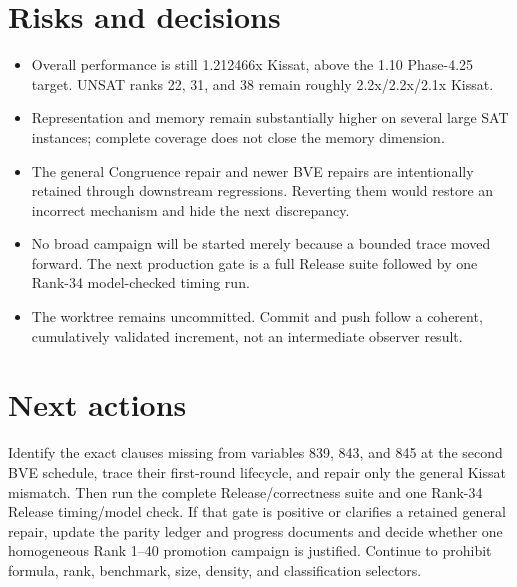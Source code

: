 \documentclass[11pt]{article}
\begin{document}
\section{Risks and decisions}

\begin{itemize}
\item Overall performance is still 1.212466x Kissat, above the 1.10 Phase-4.25
  target.  UNSAT ranks 22, 31, and 38 remain roughly 2.2x/2.2x/2.1x Kissat.
\item Representation and memory remain substantially higher on several large
  SAT instances; complete coverage does not close the memory dimension.
\item The general Congruence repair and newer BVE repairs are intentionally
  retained through downstream regressions.  Reverting them would restore an
  incorrect mechanism and hide the next discrepancy.
\item No broad campaign will be started merely because a bounded trace moved
  forward.  The next production gate is a full Release suite followed by one
  Rank-34 model-checked timing run.
\item The worktree remains uncommitted.  Commit and push follow a coherent,
  cumulatively validated increment, not an intermediate observer result.
\end{itemize}

\section{Next actions}

Identify the exact clauses missing from variables 839, 843, and 845 at the
second BVE schedule, trace their first-round lifecycle, and repair only the
general Kissat mismatch.  Then run the complete Release/correctness suite and
one Rank-34 Release timing/model check.  If that gate is positive or clarifies
a retained general repair, update the parity ledger and progress documents and
decide whether one homogeneous Rank 1--40 promotion campaign is justified.
Continue to prohibit formula, rank, benchmark, size, density, and
classification selectors.
\end{document}
